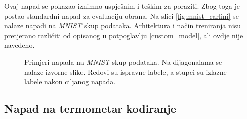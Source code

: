 \documentclass[utf8, diplomski]{fer}
\begin{document}
Ovaj napad se pokazao iznimno uspješnim i teškim za poraziti. Zbog toga je postao standardni napad za evaluaciju obrana. Na slici \ref{fig:mnist_carlini} se nalaze napadi na \textit{MNIST} skup podataka. Arhitektura i način treniranja nisu pretjerano različiti od opisanog u potpoglavlju \ref{custom_model}, ali ovdje nije navedeno.

\begin{figure}[H]
  \centering
  \hfill
  \caption{Primjeri napada na \textit{MNIST} skup podataka. Na dijagonalama se nalaze izvorne slike. Redovi su ispravne labele, a stupci su izlazne labele nakon ciljanog napada.}
\end{figure}\label{fig:mnist_carlini}

\subsection{Napad na termometar kodiranje}
\end{document}
